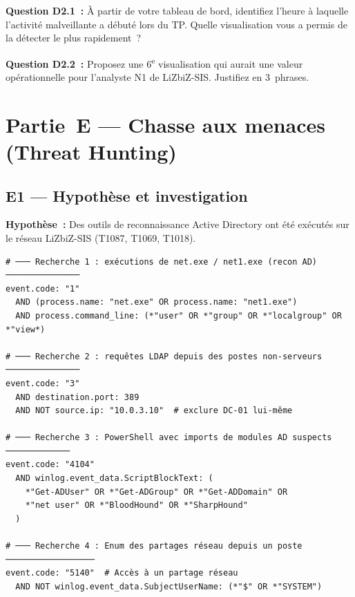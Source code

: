 \begin{boxexo}
\textbf{Question D2.1~:} À partir de votre tableau de bord, identifiez
l'heure à laquelle l'activité malveillante a débuté lors du TP.
Quelle visualisation vous a permis de la détecter le plus rapidement~?

\medskip\textbf{Question D2.2~:} Proposez une 6\textsuperscript{e}
visualisation qui aurait une valeur opérationnelle pour l'analyste N1
de LiZbiZ-SIS. Justifiez en 3~phrases.
\end{boxexo}


\section{Partie~E — Chasse aux menaces (Threat Hunting)}
\label{lab1:partieE}

\subsection{E1 — Hypothèse et investigation}

\textbf{Hypothèse~:} Des outils de reconnaissance Active Directory
ont été exécutés sur le réseau LiZbiZ-SIS (T1087, T1069, T1018).

\begin{lstlisting}[style=StyleTerminal,
  caption={Requêtes KQL de threat hunting --- recon AD},
  label={lst:lab1-hunting}]
# ─── Recherche 1 : exécutions de net.exe / net1.exe (recon AD) ───────────────
event.code: "1"
  AND (process.name: "net.exe" OR process.name: "net1.exe")
  AND process.command_line: (*"user" OR *"group" OR *"localgroup" OR *"view*)

# ─── Recherche 2 : requêtes LDAP depuis des postes non-serveurs ───────────────
event.code: "3"
  AND destination.port: 389
  AND NOT source.ip: "10.0.3.10"  # exclure DC-01 lui-même

# ─── Recherche 3 : PowerShell avec imports de modules AD suspects ─────────────
event.code: "4104"
  AND winlog.event_data.ScriptBlockText: (
    *"Get-ADUser" OR *"Get-ADGroup" OR *"Get-ADDomain" OR
    *"net user" OR *"BloodHound" OR *"SharpHound"
  )

# ─── Recherche 4 : Enum des partages réseau depuis un poste ──────────────────
event.code: "5140"  # Accès à un partage réseau
  AND NOT winlog.event_data.SubjectUserName: (*"$" OR *"SYSTEM")
\end{lstlisting}

